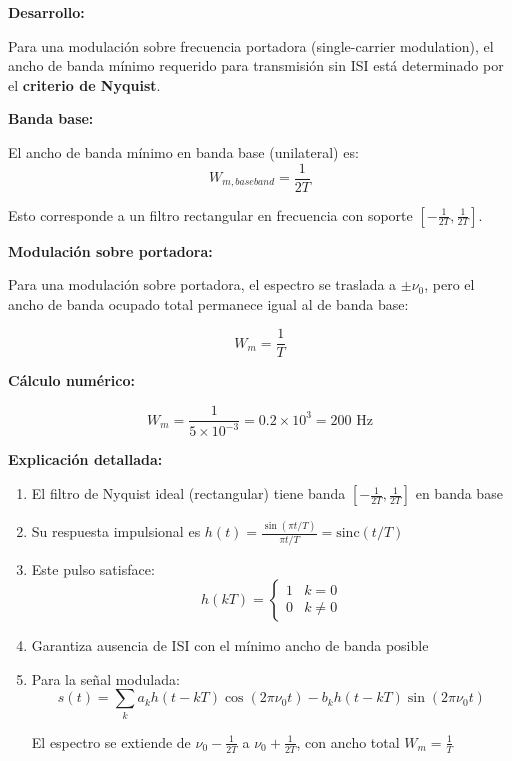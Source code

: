 \documentclass[11pt,a4paper]{article}
\begin{document}
\textbf{Desarrollo:}

Para una modulaci\'on sobre frecuencia portadora (single-carrier modulation), el ancho de banda m\'inimo requerido para transmisi\'on sin ISI est\'a determinado por el \textbf{criterio de Nyquist}.

\textbf{Banda base:}

El ancho de banda m\'inimo en banda base (unilateral) es:
\[
W_{m,baseband} = \frac{1}{2T}
\]

Esto corresponde a un filtro rectangular en frecuencia con soporte $\left[-\frac{1}{2T}, \frac{1}{2T}\right]$.

\textbf{Modulaci\'on sobre portadora:}

Para una modulaci\'on sobre portadora, el espectro se traslada a $\pm\nu_0$, pero el ancho de banda ocupado total permanece igual al de banda base:

\[
\boxed{W_m = \frac{1}{T}}
\]

\textbf{C\'alculo num\'erico:}

\[
W_m = \frac{1}{5 \times 10^{-3}} = 0.2 \times 10^3 = \boxed{200 \text{ Hz}}
\]

\textbf{Explicaci\'on detallada:}

\begin{enumerate}
    \item El filtro de Nyquist ideal (rectangular) tiene banda $\left[-\frac{1}{2T}, \frac{1}{2T}\right]$ en banda base
    
    \item Su respuesta impulsional es $h(t) = \frac{\sin(\pi t/T)}{\pi t/T} = \text{sinc}(t/T)$
    
    \item Este pulso satisface:
    \[
    h(kT) = \begin{cases}
    1 & k = 0 \\
    0 & k \neq 0
    \end{cases}
    \]
    
    \item Garantiza ausencia de ISI con el m\'inimo ancho de banda posible
    
    \item Para la se\~nal modulada:
    \[
    s(t) = \sum_k a_k h(t-kT)\cos(2\pi\nu_0 t) - b_k h(t-kT)\sin(2\pi\nu_0 t)
    \]
    
    El espectro se extiende de $\nu_0 - \frac{1}{2T}$ a $\nu_0 + \frac{1}{2T}$, con ancho total $W_m = \frac{1}{T}$
\end{enumerate}
\end{document}
